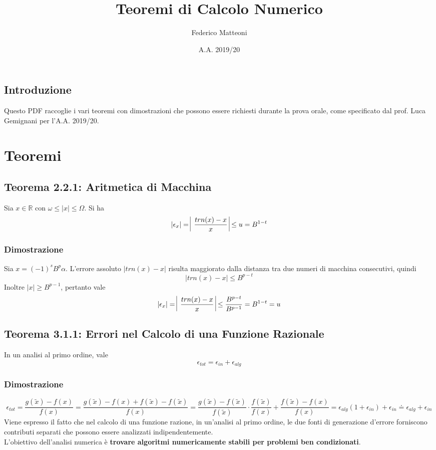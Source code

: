 \documentclass[10pt]{book}
\begin{document}
\renewcommand*\contentsname{Indice}
\title{Teoremi di Calcolo Numerico}
\author{Federico Matteoni}
\date{A.A. 2019/20}
\maketitle
\tableofcontents
\pagebreak
\section*{Introduzione}
Questo PDF raccoglie i vari teoremi con dimostrazioni che possono essere richiesti durante la prova orale, come specificato dal prof. Luca Gemignani per l'A.A. 2019/20.
\chapter{Teoremi}
\section{Teorema 2.2.1: Aritmetica di Macchina} Sia $x \in \mathbb{R}$ con $\omega \leq |x| \leq \Omega$. Si ha $$|\epsilon_x| = \:\vline\:\frac{trn(x) - x}{x}\:\vline \leq u = B^{1-t}$$
\subsection{Dimostrazione} Sia $x = (-1)^sB^p\alpha$. L'errore assoluto $|trn(x) - x|$ risulta maggiorato dalla distanza tra due numeri di macchina consecutivi, quindi $$|trn(x) - x|\leq B^{p-t}$$ Inoltre $|x| \geq B^{p-1}$, pertanto vale $$|\epsilon_x| = \:\vline\:\frac{trn(x) - x}{x}\:\vline \leq \frac{B^{p-t}}{B^{p-1}} = B^{1-t} = u$$
\section{Teorema 3.1.1: Errori nel Calcolo di una Funzione Razionale} In un analisi al primo ordine, vale $$\epsilon_{tot} = \epsilon_{in} + \epsilon_{alg}$$
\subsection{Dimostrazione} $$\epsilon_{tot} = \frac{g(\tilde{x}) - f(x)}{f(x)} = \frac{g(\tilde{x}) - f(x) +f(\tilde{x}) - f(\tilde{x})}{f(x)} = \frac{g(\tilde{x}) - f(\tilde{x})}{f(\tilde{x})}\cdot\frac{f(\tilde{x})}{f(x)} + \frac{f(\tilde{x}) - f(x)}{f(x)} = \epsilon_{alg}(1 + \epsilon_{in}) + \epsilon_{in} \doteq \epsilon_{alg} + \epsilon_{in}$$
Viene espresso il fatto che nel calcolo di una funzione razione, in un'analisi al primo ordine, le due fonti di generazione d'errore forniscono contributi separati che possono essere analizzati indipendentemente.\\
L'obiettivo dell'analisi numerica è \textbf{trovare algoritmi numericamente stabili per problemi ben condizionati}.
\end{document}
